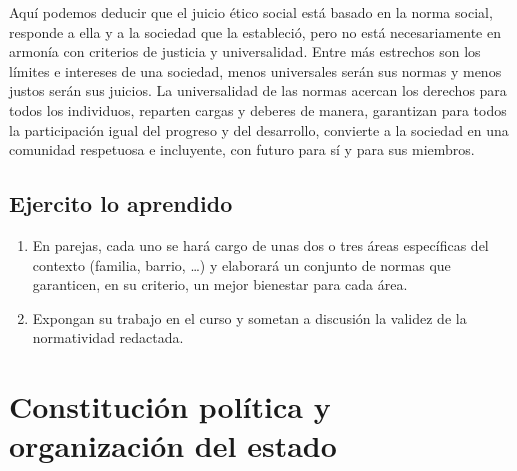 \documentclass[10pt,twoside]{article}
\begin{document}
Aquí podemos deducir que el juicio ético social está basado en
la norma social, responde a ella y a la sociedad que la estableció, pero no está necesariamente en armonía con criterios de justicia y universalidad. Entre más estrechos son los límites e intereses de una sociedad, menos universales serán sus normas y menos justos serán sus juicios. La universalidad de las normas acercan los derechos para todos
los individuos, reparten cargas y deberes de manera, garantizan para todos la participación igual del progreso y del desarrollo, convierte a la sociedad en una comunidad respetuosa e incluyente, con futuro para sí y para sus miembros.
\subsection{Ejercito lo aprendido}
\begin{enumerate}
\item En parejas, cada uno se har\'{a} cargo de unas dos o tres áreas específicas del contexto (familia, barrio, \ldots) y elaborará un conjunto de normas que garanticen, en su criterio, un mejor bienestar para cada \'{a}rea.
\item Expongan su trabajo en el curso y sometan a discusi\'{o}n la validez de la normatividad redactada.
\end{enumerate}
\section*{Constituci\'{o}n pol\'{i}tica y organizaci\'{o}n del estado}
\end{document}
